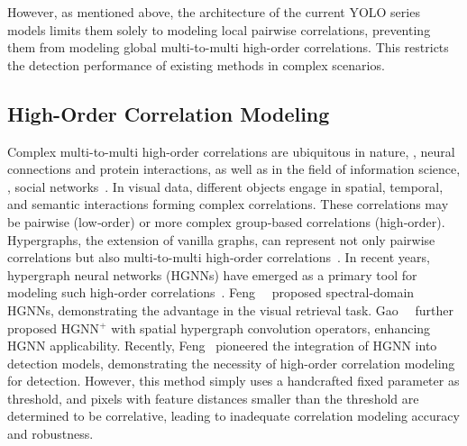 However, as mentioned above, the architecture of the current YOLO series models limits them solely to modeling local pairwise correlations, preventing them from modeling global multi-to-multi high-order correlations. This restricts the detection performance of existing methods in complex scenarios.



\subsection{High-Order Correlation Modeling}
Complex multi-to-multi high-order correlations are ubiquitous in nature, \eg, neural connections and protein interactions, as well as in the field of information science, \eg, social networks~\cite{hg_book, hg_learning}. In visual data, different objects engage in spatial, temporal, and semantic interactions forming complex correlations. These correlations may be pairwise (low‑order) or more complex group‑based correlations (high‑order).
Hypergraphs, the extension of vanilla graphs, can represent not only pairwise correlations but also multi‑to-multi high‑order correlations~\cite{hg_survey,hg_survey2}. In recent years, hypergraph neural networks (HGNNs) have emerged as a primary tool for modeling such high‑order correlations~\cite{hg_derain,hg_medical,hg_network,hyperyolo}. Feng~\etal~\cite{hgnn} proposed spectral‑domain HGNNs, demonstrating the advantage in the visual retrieval task. Gao~\etal~\cite{hgnnp} further proposed HGNN$^+$ with spatial hypergraph convolution operators, enhancing HGNN applicability.
Recently, Feng~\etal\cite{hyperyolo} pioneered the integration of HGNN into detection models, demonstrating the necessity of high-order correlation modeling for detection. However, this method simply uses a handcrafted fixed parameter as threshold, and pixels with feature distances smaller than the threshold are determined to be correlative, leading to inadequate correlation modeling accuracy and robustness.

